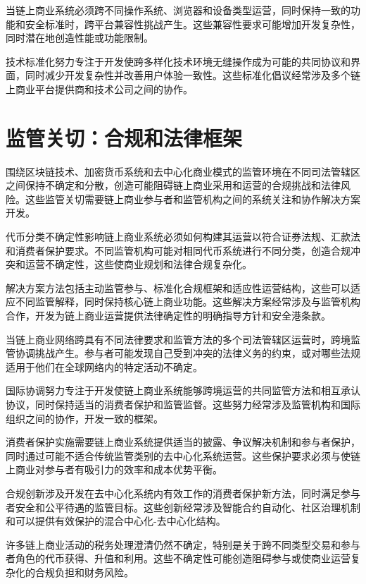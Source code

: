 \documentclass[
  Letterpaper,
]{scrbook}
\begin{document}
当链上商业系统必须跨不同操作系统、浏览器和设备类型运营，同时保持一致的功能和安全标准时，跨平台兼容性挑战产生。这些兼容性要求可能增加开发复杂性，同时潜在地创造性能或功能限制。

技术标准化努力专注于开发使跨多样化技术环境无缝操作成为可能的共同协议和界面，同时减少开发复杂性并改善用户体验一致性。这些标准化倡议经常涉及多个链上商业平台提供商和技术公司之间的协作。

\section{监管关切：合规和法律框架}\label{ux76d1ux7ba1ux5173ux5207ux5408ux89c4ux548cux6cd5ux5f8bux6846ux67b6}

围绕区块链技术、加密货币系统和去中心化商业模式的监管环境在不同司法管辖区之间保持不确定和分散，创造可能阻碍链上商业采用和运营的合规挑战和法律风险。这些监管关切需要链上商业参与者和监管机构之间的系统关注和协作解决方案开发。

代币分类不确定性影响链上商业系统必须如何构建其运营以符合证券法规、汇款法和消费者保护要求。不同监管机构可能对相同代币系统进行不同分类，创造合规冲突和运营不确定性，这些使商业规划和法律合规复杂化。

解决方案方法包括主动监管参与、标准化合规框架和适应性运营结构，这些可以适应不同监管解释，同时保持核心链上商业功能。这些解决方案经常涉及与监管机构合作，开发为链上商业运营提供法律确定性的明确指导方针和安全港条款。

当链上商业网络跨具有不同法律要求和监管方法的多个司法管辖区运营时，跨境监管协调挑战产生。参与者可能发现自己受到冲突的法律义务的约束，或对哪些法规适用于他们在全球网络内的特定活动不确定。

国际协调努力专注于开发使链上商业系统能够跨境运营的共同监管方法和相互承认协议，同时保持适当的消费者保护和监管监督。这些努力经常涉及监管机构和国际组织之间的协作，开发一致的框架。

消费者保护实施需要链上商业系统提供适当的披露、争议解决机制和参与者保护，同时通过可能不适合传统监管类别的去中心化系统运营。这些保护要求必须与使链上商业对参与者有吸引力的效率和成本优势平衡。

合规创新涉及开发在去中心化系统内有效工作的消费者保护新方法，同时满足参与者安全和公平待遇的监管目标。这些创新经常涉及智能合约自动化、社区治理机制和可以提供有效保护的混合中心化-去中心化结构。

许多链上商业活动的税务处理澄清仍然不确定，特别是关于跨不同类型交易和参与者角色的代币获得、升值和利用。这些不确定性可能创造阻碍参与或使商业运营复杂化的合规负担和财务风险。
\end{document}
